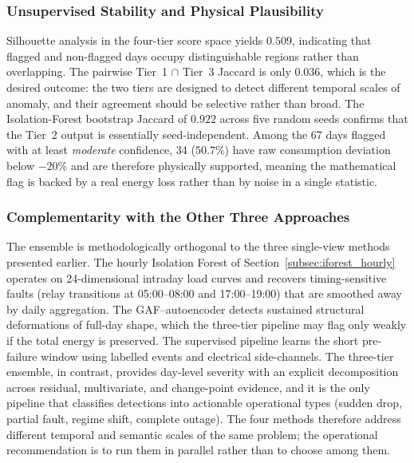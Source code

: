 \documentclass{article}
\begin{document}
\subsubsection{Unsupervised Stability and Physical Plausibility}

Silhouette analysis \cite{rousseeuw1987silhouettes} in the four-tier score space yields $0.509$, indicating that flagged and non-flagged days occupy distinguishable regions rather than overlapping. The pairwise Tier~1 $\cap$ Tier~3 Jaccard is only $0.036$, which is the desired outcome: the two tiers are designed to detect different temporal scales of anomaly, and their agreement should be selective rather than broad. The Isolation-Forest bootstrap Jaccard of $0.922$ across five random seeds confirms that the Tier~2 output is essentially seed-independent. Among the 67 days flagged with at least \textit{moderate} confidence, 34 ($50.7\%$) have raw consumption deviation below $-20\%$ and are therefore physically supported, meaning the mathematical flag is backed by a real energy loss rather than by noise in a single statistic.

\subsubsection{Complementarity with the Other Three Approaches}

The ensemble is methodologically orthogonal to the three single-view methods presented earlier. The hourly Isolation Forest of Section~\ref{subsec:iforest_hourly} operates on 24-dimensional intraday load curves and recovers timing-sensitive faults (relay transitions at 05:00--08:00 and 17:00--19:00) that are smoothed away by daily aggregation. The GAF--autoencoder detects sustained structural deformations of full-day shape, which the three-tier pipeline may flag only weakly if the total energy is preserved. The supervised pipeline learns the short pre-failure window using labelled events and electrical side-channels. The three-tier ensemble, in contrast, provides day-level severity with an explicit decomposition across residual, multivariate, and change-point evidence, and it is the only pipeline that classifies detections into actionable operational types (sudden drop, partial fault, regime shift, complete outage). The four methods therefore address different temporal and semantic scales of the same problem; the operational recommendation is to run them in parallel rather than to choose among them.
\end{document}
